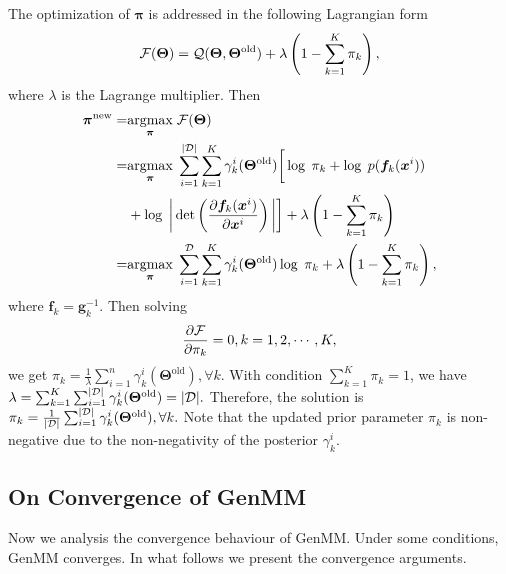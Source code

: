 The optimization of $\bm{\pi}$ is addressed in the following Lagrangian form
\begin{equation}
  \mathcal{F}(\bm{\Theta}) = \mathcal{Q}(\bm{\Theta},\bm{\Theta}^{\mathrm{old}}) + \lambda
  \left( 1 - \sum_{k=1}^{K}\pi_k \right),
\end{equation}
where $\lambda$ is the Lagrange multiplier. Then
\begin{align}
  \bm{\pi}^{\mathrm{new}} =& \underset{\bm{\pi}}{\operatorname{argmax}}\;{ \mathcal{F}(\bm{\Theta})} \nonumber\\
  =&  \underset{\bm{\pi}}{\operatorname{argmax}}\;{}\sum_{i=1}^{| \mathcal{D} |}
     \sum_{k=1}^{K}\gamma_k^{i}(\bm{\Theta}^{\mathrm{old}})\bigg[
     \log\;\pi_k +   \log\;p(\bm{f}_k(\bm{x}^{i})) \nonumber \\
                           &+ \log\;\bigg|\det\left(
                             \frac{ \partial \bm{f}_k(\bm{x}^{i})}{\partial \bm{x}^{i}}
                             \right)\bigg|\bigg] + \lambda  \left( 1 - \sum_{k=1}^{K}\pi_k \right) \nonumber\\
  =& \underset{\bm{\pi}}{\operatorname{argmax}}\;{} \sum_{i=1}^{\mathcal{D}}
     \sum_{k=1}^{K}\gamma_k^{i}(\bm{\Theta}^{\mathrm{old}})
     \log\;\pi_k+ \lambda  \left( 1 - \sum_{k=1}^{K}\pi_k \right),
\end{align}
where $\bm{f}_k = \bm{g}_k^{-1}$. Then solving
\begin{equation}
  \frac{ \partial \mathcal{F}}{\partial \pi_k} = 0, k=1, 2, \cdots, K,
\end{equation}
we get 
$
\pi_k = \frac{1}{\lambda}
\sum_{i=1}^{n}\gamma_k^{i}(\bm{\Theta}^{\mathrm{old}}), \forall k.
$
With condition $\sum_{k=1}^{K}\pi_k =1$, we have
$
\lambda = \sum_{k=1}^{K}\sum_{i=1}^{| \mathcal{D} |}\gamma_k^{i}(\bm{\Theta}^{\mathrm{old}}) =| \mathcal{D} |.
$
Therefore, the solution is
$
\pi_k = \frac{1}{| \mathcal{D} |}
\sum_{i=1}^{| \mathcal{D} |}\gamma_k^{i}(\bm{\Theta}^{\mathrm{old}}), \forall k.
$
Note that the updated prior parameter $\pi_k$
is non-negative due to the non-negativity of the posterior $\gamma_k^{i}$.

\subsection{On Convergence of GenMM}
Now we analysis the convergence behaviour of GenMM. Under some conditions, GenMM converges. In what follows we present the convergence arguments.

